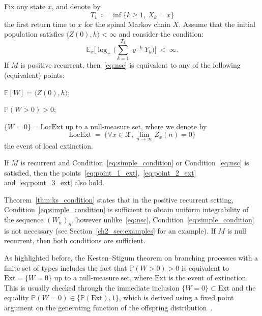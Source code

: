 \begin{refsegment}
\begin{thm}\label{thm:ks_condition}
  Fix any state $x$, and denote by 
  \[T_1\ \coloneqq\ \inf\big\{k\geq 1,\ X_k=x \big\}
  \] 
   the first return time to $x$ for the spinal Markov chain $X$. Assume that the initial population satisfies $\langle Z(0), h\rangle<\infty$ and consider the condition:
  \begin{equation}\label{eq:nsc}\tag{B}
    \mathbb{E}_x\bigg[\log_+\Big(\sum_{k=1}^{T_1}\varrho^{-k} Y_k\Big)\bigg]\ <\ \infty.
  \end{equation}
If $M$ is positive recurrent, then~\eqref{eq:nsc} is equivalent to any of the following (equivalent) points:
  \begin{mathlist}
    \item\label{eq:point_1_ext} $\mathbb{E}[W]=\langle Z(0), h\rangle$;
    \item\label{eq:point_2_ext} $\mathbb{P}(W>0)>0$;
    \item\label{eq:point_3_ext} $\{W=0\}=\mathrm{LocExt}$ up to a null-measure set,
    where we denote by \[
    \mathrm{LocExt}\ =\ \big\{\forall x\in \mathcal{X}, \lim_{n\to\infty} Z_x(n)=0\big\}
    \] the event of local extinction.
  \end{mathlist}
  If $M$ is recurrent and Condition~\eqref{eq:simple_condition} or Condition~\eqref{eq:nsc} is satisfied, then the points~\ref{eq:point_1_ext},~\ref{eq:point_2_ext} and~\ref{eq:point_3_ext} also hold.
\end{thm}
\begin{rem}
Theorem~\ref{thm:ks_condition} states that in the positive recurrent setting, Condition~\eqref{eq:simple_condition} is sufficient to obtain uniform integrability of the sequence $(W_n)_n$, however unlike~\eqref{eq:nsc}, Condition~\eqref{eq:simple_condition} is not necessary (see Section~\ref{ch2_sec:examples} for an example).
If $M$ is null recurrent, then both conditions are sufficient.
\end{rem}
\begin{rem}\label{rem:extinction}
As highlighted before, the Kesten--Stigum theorem on branching
processes with a finite set of types includes the fact that $\mathbb{P}(W>0)>0$ is equivalent to $\mathrm{Ext}=\{W=0\}$ up to a null-measure set, where $\mathrm{Ext}$ is the event of extinction. This is usually checked through the immediate inclusion $\{W=0\}\subset\mathrm{Ext}$ and the equality $\mathbb{P}(W=0)\in\{\mathbb{P}(\mathrm{Ext}),1\}$, which is derived using a fixed point argument on the generating function of the offspring distribution~\citep{harris_theory_1964}.


\end{rem}
\end{refsegment}
